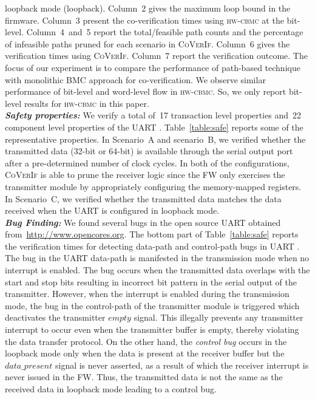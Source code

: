 \documentclass[sigconf]{acmart}
\newcommand{\sjcmt}[1]{{\color{blue} [{#1}]}}
\newcommand{\tool}[1]{\textsc{#1}\xspace}
\newcommand{\hwcbmcv}{\tool{hw-cbmc}}
\newcommand{\verifox}{\tool{CoVerIf}}
\begin{document}
loopback mode (loopback).  Column~2 gives the maximum loop bound in the
firmware.  Column~3 present the co-verification times using \hwcbmcv
at the bit-level.  Column~4~and~5 report the total/feasible path counts and the 
percentage of infeasible paths pruned for each scenario in \verifox.  
Column~6 gives the verification times using \verifox.  Column~7 report 
the verification outcome. The focus of our experiment is to compare 
the performance of path-based technique with monolithic BMC approach for 
co-verification.  We observe similar performance of bit-level and word-level 
flow in \hwcbmcv. So, we only report bit-level results for \hwcbmcv in this
paper. \\ 
\textbf{\emph{Safety properties:}}
We verify a total of~17 transaction level properties and~22 component level 
properties of the UART .  Table~\ref{table:safe} reports some of the
representative properties.  In Scenario~A and scenario~B, we verified whether
the transmitted data (32-bit or 64-bit) is available through the serial
output port after a pre-determined number of clock cycles.
In both of the configurations, \verifox is able to prune the receiver logic since the
FW only exercises the transmitter module by appropriately configuring
the memory-mapped registers.  In Scenario~C, we verified whether the transmitted
data matches the data received when the UART is configured in loopback
mode.\\ 
\textbf{\emph{Bug Finding:}}
We found several bugs in the open source UART  obtained from~\url{http://www.opencores.org}.  
The bottom part of Table~\ref{table:safe} reports the verification
times for detecting data-path and control-path bugs in UART .  
The bug in the UART data-path is manifested in the transmission mode when no
interrupt is enabled.  The bug occurs when the transmitted data overlaps
with the start and stop bits resulting in incorrect bit pattern in the
serial output of the transmitter.  However, when the interrupt is enabled
during the transmission mode, the bug in the control-path of the transmitter
module is triggered which deactivates the transmitter $empty$ signal.  This
illegally prevents any transmitter interrupt to occur even when the
transmitter buffer is empty, thereby violating the data transfer protocol. 
On the other hand, the \emph{control bug} occurs in the loopback mode only when the
data is present at the receiver buffer but the $data\_present$ signal is
never asserted, as a result of which the receiver interrupt is never issued
in the FW. Thus, the transmitted data is not the same as the received
data in loopback mode leading to a control bug.
\end{document}
